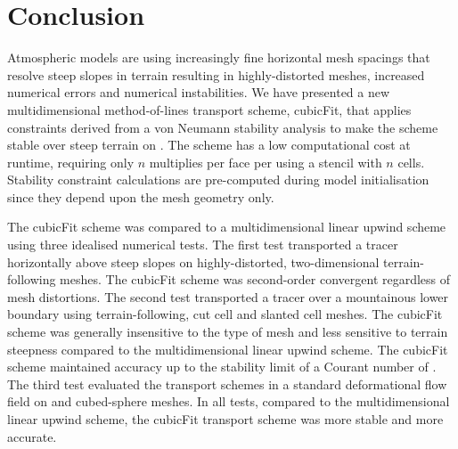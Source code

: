 \section{Conclusion}
\label{sec:conclusion}

Atmospheric models are using increasingly fine horizontal mesh spacings that resolve steep slopes in terrain resulting in highly-distorted meshes, increased numerical errors and numerical instabilities.
We have presented a new multidimensional method-of-lines transport scheme, cubicFit, that applies constraints derived from a von Neumann stability analysis to make the scheme stable over steep terrain on .
The scheme has a low computational cost at runtime, requiring only $n$ multiplies per face per  using a stencil with $n$ cells.  Stability constraint calculations are pre-computed during model initialisation since they depend upon the mesh geometry only.

The cubicFit scheme was compared to a multidimensional linear upwind scheme using three idealised numerical tests.
The first test transported a tracer horizontally above steep slopes on highly-distorted, two-dimensional terrain-following meshes.  The cubicFit scheme was second-order convergent regardless of mesh distortions.
The second test transported a tracer over a mountainous lower boundary using terrain-following, cut cell and slanted cell meshes.
The cubicFit scheme was generally insensitive to the type of mesh and less sensitive to terrain steepness compared to the multidimensional linear upwind scheme.
The cubicFit scheme maintained accuracy up to the stability limit of a Courant number of .
The third test evaluated the transport schemes in a standard deformational flow field on  and cubed-sphere meshes.
In all tests, compared to the multidimensional linear upwind scheme, the cubicFit transport scheme was more stable and more accurate.

